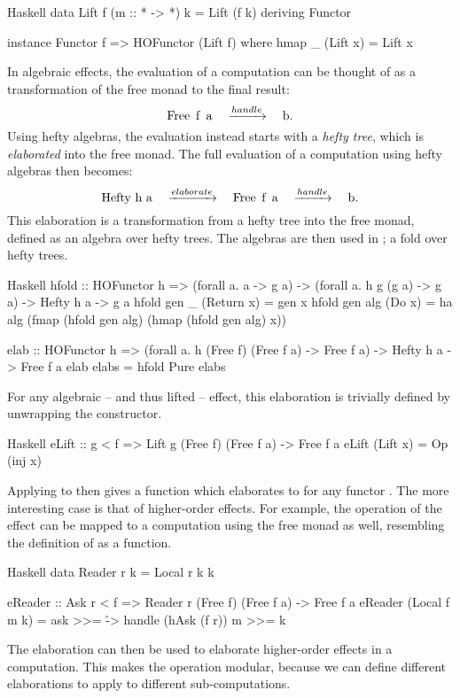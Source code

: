 \begin{lst}{Haskell}
data Lift f (m :: * -> *) k = Lift (f k)
  deriving Functor

instance Functor f => HOFunctor (Lift f) where
  hmap _ (Lift x) = Lift x
\end{lst}
%
In algebraic effects, the evaluation of a computation can be thought of as a transformation of the free monad to the final result: 
\[
    \mcode{Free f a} \quad\xrightarrow{handle}\quad \mcode{b}.
\]
Using hefty algebras, the evaluation instead starts with a \emph{hefty tree}, which is \emph{elaborated} into the free monad. The full evaluation of a computation using hefty algebras then becomes:
\[
    \mcode{Hefty h a} \quad\xrightarrow{elaborate}\quad \mcode{Free f a} \quad\xrightarrow{handle}\quad \mcode{b}.
\]
This elaboration is a transformation from a hefty tree into the free monad, defined as an algebra over hefty trees. The algebras are then used in ; a fold over hefty trees.

\begin{lst}{Haskell}
hfold :: HOFunctor h
      => (forall a. a -> g a)
      -> (forall a. h g (g a) -> g a)
      -> Hefty h a 
      -> g a
hfold gen _   (Return x) = gen x
hfold gen alg (Do x)     =
  ha alg (fmap (hfold gen alg) (hmap (hfold gen alg) x))

elab :: HOFunctor h
     => (forall a. h (Free f) (Free f a) -> Free f a)
     -> Hefty h a
     -> Free f a
elab elabs = hfold Pure elabs
\end{lst}
%
For any algebraic -- and thus lifted -- effect, this elaboration is trivially defined by unwrapping the  constructor.

\begin{lst}{Haskell}
eLift :: g < f => Lift g (Free f) (Free f a) -> Free f a
eLift (Lift x) = Op (inj x)
\end{lst}
%
Applying  to  then gives a function which elaborates  to  for any functor . The more interesting case is that of higher-order effects. For example, the  operation of the  effect can be mapped to a computation using the free monad as well, resembling the definition of  as a function.

\begin{lst}{Haskell}
data Reader r k = Local r k k

eReader :: Ask r < f
           => Reader r (Free f) (Free f a)
           -> Free f a
eReader (Local f m k) = ask >>= \r -> handle (hAsk (f r)) m >>= k
\end{lst}
%
The  elaboration can then be used to elaborate higher-order effects in a computation. This makes the  operation modular, because we can define different elaborations to apply to different sub-computations. 

